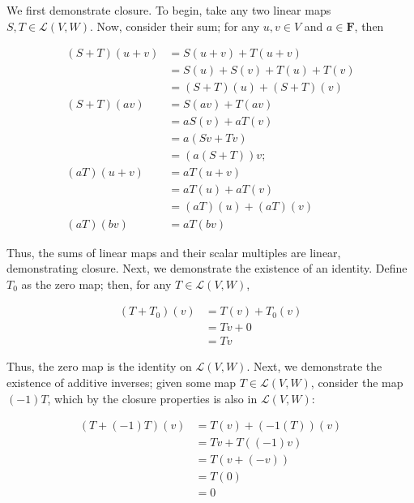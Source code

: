 \documentclass{book}
\begin{document}
\begin{enumerate}
We first demonstrate closure.  To begin, take any two linear maps \(S,T \in \mathcal{L}(V,W)\).  Now, consider their sum; for any \(u,v \in V\) and \(a \in \textbf{F}\), then

\begin{equation*}
    \begin{split}
        (S+T)(u+v) &= S(u+v)+T(u+v) \\
        &= S(u)+S(v)+T(u)+T(v) \\
        &= (S+T)(u)+(S+T)(v) \\
        (S+T)(av) &= S(av)+T(av)\\
        &= aS(v)+aT(v) \\
        &= a(Sv+Tv) \\
        &= (a(S+T))v; \\
        (aT)(u+v) &= aT(u+v) \\
        &= aT(u) + aT(v) \\
        &= (aT)(u)+(aT)(v) \\
        (aT)(bv) &= aT(bv)
    \end{split}
\end{equation*}

Thus, the sums of linear maps and their scalar multiples are linear, demonstrating closure.  Next, we demonstrate the existence of an identity.  Define \(T_0\) as the zero map; then, for any \(T \in \mathcal{L}(V,W)\),

\begin{equation*}
    \begin{split}
        (T+T_0)(v) &= T(v)+T_0(v) \\
        &= Tv+0 \\
        &= Tv
    \end{split}
\end{equation*}

Thus, the zero map is the identity on \(\mathcal{L}(V,W)\).  Next, we demonstrate the existence of additive inverses; given some map \(T \in \mathcal{L}(V,W)\), consider the map \((-1)T\), which by the closure properties is also in \(\mathcal{L}(V,W)\):

\begin{equation*}
    \begin{split}
        (T+(-1)T)(v) &= T(v)+(-1(T))(v) \\
        &= Tv+T((-1)v) \\
        &= T(v+(-v)) \\
        &= T(0) \\
        &= 0
    \end{split}
\end{equation*}


\end{enumerate}
\end{document}
